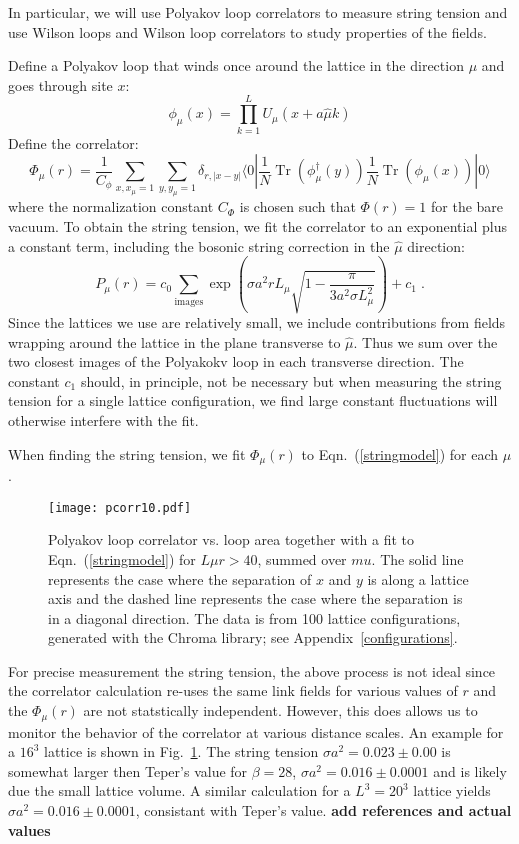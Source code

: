 \documentclass[preprint,aps,prd]{revtex4-2}
\newcommand{\be}{\begin{equation}}
\newcommand{\eq}{\end{equation}}
\DeclareMathOperator{\Tr}{Tr}
\begin{document}
In particular, we will use Polyakov loop correlators to measure
string tension and use Wilson loops and Wilson loop correlators to
study properties of the fields.

Define a Polyakov loop that winds once around the lattice
in the direction $\mu$ and goes through site $x$:
\be
         \phi_\mu(x)= \prod_{k=1}^L U_\mu(x+a \hat{\mu} k)
\eq
Define the correlator:
\be
\Phi_\mu(r) = \frac{1}{C_\phi} \sum_{x, x_\mu=1} \sum_{y, y_\mu=1}
           \delta_{r,|x-y|}
           \langle 0 | \frac{1}{N} \Tr\left(\phi_\mu^\dagger(y)\right)
           \frac{1}{N} \Tr\left(\phi_\mu(x)\right) |0\rangle
           \label{pcorr}
\eq
%
where the normalization constant $C_\Phi$ is chosen such that
$\Phi(r)=1$ for the bare vacuum.  To obtain the string tension,
we fit the correlator to an exponential plus a constant term,
including the bosonic string correction in the $\hat{\mu}$
direction:
\be
P_\mu(r) = c_0 \sum_{\mbox{images}}
      \exp\left(\sigma a^2 r L_\mu\sqrt{1-\frac{\pi}{3 a^2 \sigma L_\mu^2}}\right)
      + c_1 \; .  \label{stringmodel}
\eq    
Since the lattices we use are relatively small, we include contributions from fields wrapping around the lattice in the plane transverse to $\hat{\mu}$.  Thus we sum over the two closest images of the Polyakokv loop in each transverse
direction.  The constant $c_1$ should, in principle, not be necessary
but when measuring the string tension for a single lattice configuration,
we find large constant fluctuations will otherwise interfere with the fit.

When finding the string tension, we fit $\Phi_\mu(r)$ to
Eqn.~(\ref{stringmodel}) for each $\mu$.

\begin{figure}
  \texttt{[image: pcorr10.pdf]}
  \caption{Polyakov loop correlator vs. loop area together with
    a fit to Eqn.~(\ref{stringmodel}) for $L\mu r>40$, summed over
    $mu$.  The solid line
    represents the case where the separation of $x$
    and $y$ is along a lattice axis and the dashed line
    represents the case where the separation is in
    a diagonal direction.  The data is from 100 lattice
    configurations, generated with the Chroma library;
    see Appendix~\ref{configurations}. \label{pcorr16}}
\end{figure}

For precise measurement the string tension, the above process is
not ideal since the correlator calculation re-uses the same link
fields for various values of $r$ and the $\Phi_\mu(r)$ are not
statstically independent.
However, this does allows us to monitor the behavior of the correlator at
various distance scales.  An example for a $16^3$ lattice is shown
in Fig.~\ref{pcorr16}.  The string tension $\sigma a^2 = 0.023 \pm 0.00$
is somewhat larger then Teper's value for $\beta=28$,
$\sigma a^2 = 0.016\pm 0.0001$ and is likely due the small lattice volume.
A similar calculation for a $L^3=20^3$ lattice yields
$\sigma a^2 = 0.016\pm 0.0001$, consistant with Teper's value.
{\bf add references and actual values}
\end{document}
